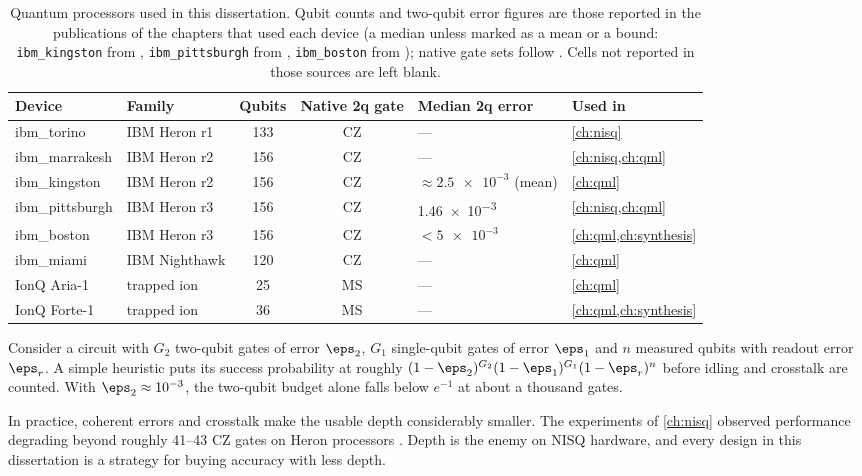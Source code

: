 \begin{table}[htbp]
\caption{Quantum processors used in this dissertation. Qubit counts and two-qubit error figures are those reported in the publications of the chapters that used each device (a median unless marked as a mean or a bound: \texttt{ibm\_kingston} from \cite{guo2025vqt}, \texttt{ibm\_pittsburgh} from \cite{guo2025shardq}, \texttt{ibm\_boston} from \cite{guo2026nnqa}); native gate sets follow \cite{guo2026rubriq}. Cells not reported in those sources are left blank.}
\label{tab:bg:devices}
\centering\footnotesize
\begin{tabular}{@{}llccll@{}}
\toprule
Device & Family & Qubits & Native 2q gate & Median 2q error & Used in \\
\midrule
ibm\_torino & IBM Heron r1 & 133 & CZ & --- & \cref{ch:nisq} \\
ibm\_marrakesh & IBM Heron r2 & 156 & CZ & --- & \cref{ch:nisq,ch:qml} \\
ibm\_kingston & IBM Heron r2 & 156 & CZ & $\approx\num{2.5e-3}$ (mean) & \cref{ch:qml} \\
ibm\_pittsburgh & IBM Heron r3 & 156 & CZ & \num{1.46e-3} & \cref{ch:nisq,ch:qml} \\
ibm\_boston & IBM Heron r3 & 156 & CZ & $<\num{5e-3}$ & \cref{ch:qml,ch:synthesis} \\
ibm\_miami & IBM Nighthawk & 120 & CZ & --- & \cref{ch:qml} \\
IonQ Aria-1 & trapped ion & 25 & MS & --- & \cref{ch:qml} \\
IonQ Forte-1 & trapped ion & 36 & MS & --- & \cref{ch:qml,ch:synthesis} \\
\bottomrule
\end{tabular}
\end{table}

Consider a circuit with $G_2$ two-qubit gates of error $\eps_2$, $G_1$ single-qubit gates of error $\eps_1$ and $n$ measured qubits with readout error $\eps_r$. A simple heuristic puts its success probability at roughly $(1-\eps_2)^{G_2}(1-\eps_1)^{G_1}(1-\eps_r)^{n}$ before idling and crosstalk are counted. With $\eps_2\approx10^{-3}$, the two-qubit budget alone falls below $e^{-1}$ at about a thousand gates.

In practice, coherent errors and crosstalk make the usable depth considerably smaller. The \deal{} experiments of \cref{ch:nisq} observed performance degrading beyond roughly 41--43 CZ gates on Heron processors \cite{guo2025deal}. Depth is the enemy on NISQ hardware, and every design in this dissertation is a strategy for buying accuracy with less depth.

